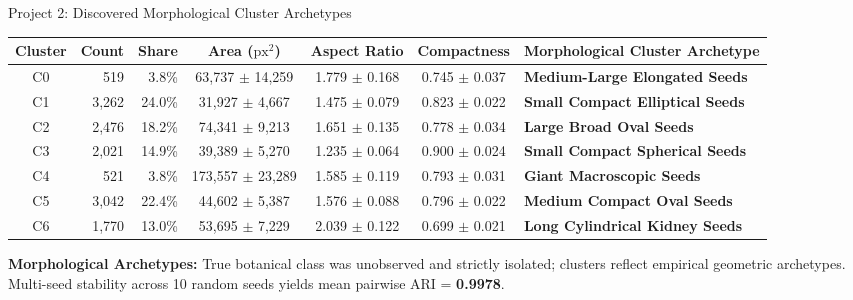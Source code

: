 \documentclass[aspectratio=169,10pt]{beamer}
\begin{document}
\begin{frame}{Project 2: Discovered Morphological Cluster Archetypes}
\begin{table}
\centering
\scriptsize
\setlength{\tabcolsep}{3.5pt}
\begin{tabularx}{\textwidth}{c r r c c c l}
\toprule
\textbf{Cluster} & \textbf{Count} & \textbf{Share} & \textbf{Area ($\text{px}^2$)} & \textbf{Aspect Ratio} & \textbf{Compactness} & \textbf{Morphological Cluster Archetype} \\
\midrule
C0 & 519 & 3.8\% & 63,737 $\pm$ 14,259 & 1.779 $\pm$ 0.168 & 0.745 $\pm$ 0.037 & \textbf{Medium-Large Elongated Seeds} \\
C1 & 3,262 & 24.0\% & 31,927 $\pm$ 4,667 & 1.475 $\pm$ 0.079 & 0.823 $\pm$ 0.022 & \textbf{Small Compact Elliptical Seeds} \\
C2 & 2,476 & 18.2\% & 74,341 $\pm$ 9,213 & 1.651 $\pm$ 0.135 & 0.778 $\pm$ 0.034 & \textbf{Large Broad Oval Seeds} \\
C3 & 2,021 & 14.9\% & 39,389 $\pm$ 5,270 & 1.235 $\pm$ 0.064 & 0.900 $\pm$ 0.024 & \textbf{Small Compact Spherical Seeds} \\
C4 & 521 & 3.8\% & 173,557 $\pm$ 23,289 & 1.585 $\pm$ 0.119 & 0.793 $\pm$ 0.031 & \textbf{Giant Macroscopic Seeds} \\
C5 & 3,042 & 22.4\% & 44,602 $\pm$ 5,387 & 1.576 $\pm$ 0.088 & 0.796 $\pm$ 0.022 & \textbf{Medium Compact Oval Seeds} \\
C6 & 1,770 & 13.0\% & 53,695 $\pm$ 7,229 & 2.039 $\pm$ 0.122 & 0.699 $\pm$ 0.021 & \textbf{Long Cylindrical Kidney Seeds} \\
\bottomrule
\end{tabularx}
\end{table}
\footnotesize
\textbf{Morphological Archetypes:} True botanical class was unobserved and strictly isolated; clusters reflect empirical geometric archetypes. Multi-seed stability across 10 random seeds yields mean pairwise ARI = \textbf{0.9978}.
\end{frame}
\end{document}
